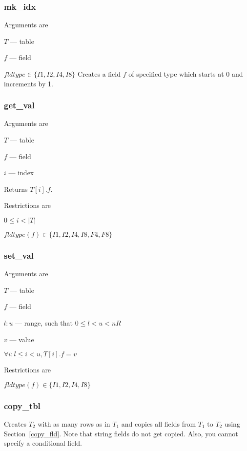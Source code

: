 
\subsubsection{mk\_idx}
\label{mk_idx} 
Arguments are 
\be
\item \(T\) --- table
\item \(f\) --- field
\item \(fldtype \in \{I1, I2, I4, I8\}\)
\ee
Creates a field \(f\) of specified type which starts at 0 and
increments by 1.

\subsubsection{get\_val}
\label{get_val}
Arguments are 
\be
\item \(T\) --- table
\item \(f\) --- field
\item \(i\) --- index 
\ee

Returns \(T[i].f\). 

Restrictions are
\be
\item \(0 \leq i < |T|\)
\item \(fldtype(f) \in \{I1, I2, I4, I8, F4, F8\}\)
\ee

\subsubsection{set\_val}
\label{set_val}
Arguments are 
\be
\item \(T\) --- table
\item \(f\) --- field
\item \(l:u\) --- range, such that \(0 \leq l < u < nR\) 
\item \(v\) --- value 
\ee

\(\forall i: l \leq i < u, T[i].f = v\)

Restrictions are
\be
\item \(fldtype(f) \in \{I1, I2, I4, I8\}\)
\ee

\subsubsection{copy\_tbl}
\label{copy_tbl}

Creates \(T_2\) with as many rows as in \(T_1\) and copies all fields
from \(T_1\) to \(T_2\) using Section~\ref{copy_fld}. Note that string
fields do not get copied. Also, you cannot specify a conditional field.

